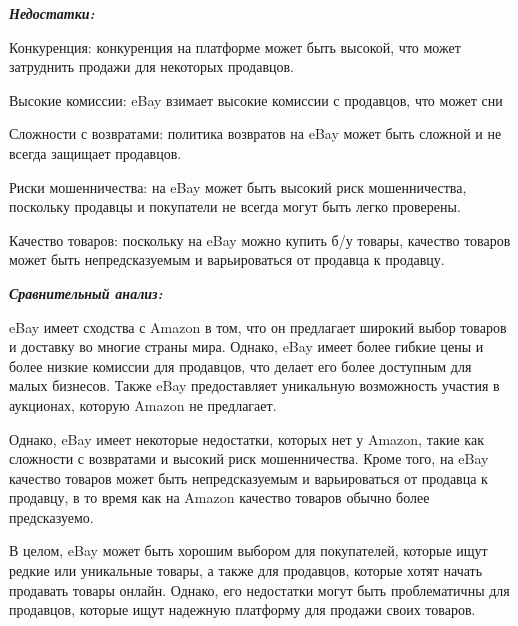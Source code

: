 \textbf{\emph{Недостатки:}}

\begin{compactitem}
    \item  Конкуренция: конкуренция на платформе может быть высокой, что может затруднить продажи для некоторых продавцов.

    \item  Высокие комиссии: eBay взимает высокие комиссии с продавцов, что может сни

    \item  Сложности с возвратами: политика возвратов на eBay может быть сложной и не всегда защищает продавцов.

    \item  Риски мошенничества: на eBay может быть высокий риск мошенничества, поскольку продавцы и покупатели не всегда могут быть легко проверены.

    \item  Качество товаров: поскольку на eBay можно купить б/у товары, качество товаров может быть непредсказуемым и варьироваться от продавца к продавцу.
\end{compactitem}

\textbf{\emph{Сравнительный анализ:}}

eBay имеет сходства с Amazon в том, что он предлагает широкий выбор товаров и доставку во многие страны мира. Однако, eBay имеет более гибкие цены и более низкие комиссии для продавцов, что делает его более доступным для малых бизнесов. Также eBay предоставляет уникальную возможность участия в аукционах, которую Amazon не предлагает.

Однако, eBay имеет некоторые недостатки, которых нет у Amazon, такие как сложности с возвратами и высокий риск мошенничества. Кроме того, на eBay качество товаров может быть непредсказуемым и варьироваться от продавца к продавцу, в то время как на Amazon качество товаров обычно более предсказуемо.

В целом, eBay может быть хорошим выбором для покупателей, которые ищут редкие или уникальные товары, а также для продавцов, которые хотят начать продавать товары онлайн. Однако, его недостатки могут быть проблематичны для продавцов, которые ищут надежную платформу для продажи своих товаров.












\bigbreak
\bigbreak

